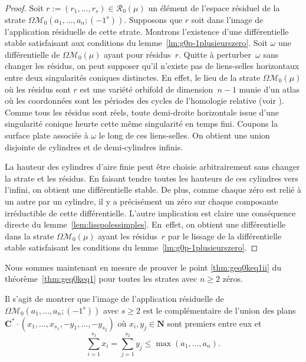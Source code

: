 \documentclass[JEP,XML,SOM,Unicode,francais,NoFloatCountersInSection,published]{cedram}
\let\mathcal\mathscr
\newcommand{\CC}{\mathbf{C}}
\newcommand{\NN}{\mathbf{N}}
\newcommand{\espres}[1][g]{\mathcal{R}_{#1}}
\newcommand{\omoduli}[1][g]{{\Omega\mathcal M}_{\!#1}}
\theoremstyle{definition}
\begin{document}
\begin{proof}
Soit $r:=(r_{1},\dots,r_{s})\in\espres[0](\mu)$ un élément de l'espace résiduel de la strate $\omoduli[0](a_{1},\dots,a_{n};(-1^{s}))$.
Supposons que $r$ soit dans l'image de l'application résiduelle de cette strate. Montrons l'existence d'une différentielle stable satisfaisant aux conditions du lemme~\ref{lm:g0p-1plusieurszero}. Soit $\omega$ une différentielle de $\omoduli[0](\mu)$ ayant pour résidus~$r$. Quitte à perturber~$\omega$ sans changer les résidus, on peut supposer qu'il n'existe pas de liens-selles horizontaux entre deux singularités coniques distinctes. En effet, le lieu de la strate $\omoduli[0](\mu)$ où les résidus sont $r$ est une variété orbifold de dimension~$n-1$ munie d'un atlas où les coordonnées sont les périodes des cycles de l'homologie relative (voir \cite{BCGGM3}). Comme tous les résidus sont réels, toute demi-droite horizontale issue d'une singularité conique heurte cette même singularité en temps fini. Coupons la surface plate associée à $\omega$ le long de ces liens-selles. On obtient une union disjointe de cylindres et de demi-cylindres infinis.

La hauteur des cylindres d'aire finie peut être choisie arbitrairement sans changer la strate et les résidus. En faisant tendre toutes les hauteurs de ces cylindres vers l'infini, on obtient une différentielle stable. De plus, comme chaque zéro est relié à un autre par un cylindre, il y a précisément un zéro sur chaque composante irréductible de cette différentielle.
L'autre implication est claire une conséquence directe du lemme~\ref{lem:lisspolessimples}. En~effet, on obtient une différentielle dans la strate $\omoduli[0](\mu)$ ayant les résidus~$r$ par le lissage de la différentielle stable satisfaisant les conditions du lemme~\ref{lm:g0p-1plusieurszero}.
\end{proof}

Nous sommes maintenant en mesure de prouver le point \eqref{thm:geq0keq1ii} du théorème~\ref{thm:geq0keq1} pour toutes les strates avec $n\geq 2$ zéros.

Il s'agit de montrer que l'image de l'application résiduelle de $\omoduli[0](a_{1},\dots,a_{n};\!(-1^{s}))$ avec $s\geq2$ est le complémentaire de l'union des plans $\CC^{\ast} \cdot (x_{1},\dots,x_{s_{1}},-y_{1},\dots,-y_{s_{2}})$ où $x_{i},y_{j} \in \NN$ sont premiers entre eux et\vspace*{-3pt}
\begin{equation*}
\sum_{i=1}^{s_{1}} x_{i} = \sum_{j=1}^{s_{2}} y_{j} \leq \max(a_{1},\dots,a_{n}).
\end{equation*}
\end{document}
